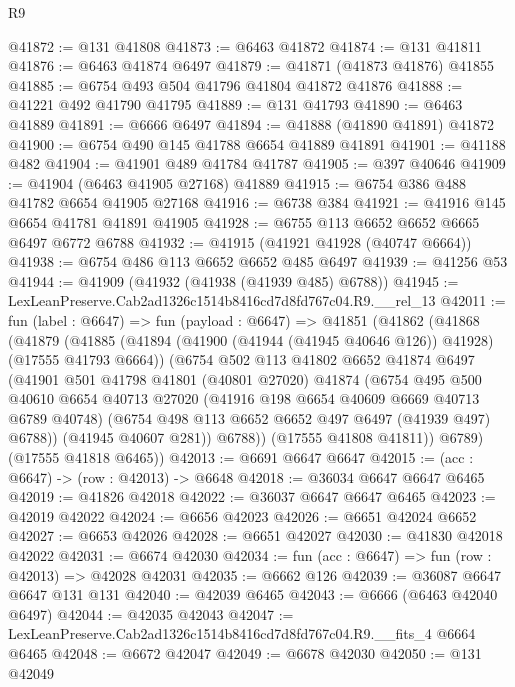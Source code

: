 \begin{lexlean}{R9}
\begin{coremodule}
@41872 := @131 @41808
@41873 := @6463 @41872
@41874 := @131 @41811
@41876 := @6463 @41874 @6497
@41879 := @41871 (@41873 @41876) @41855
@41885 := @6754 @493 @504 @41796 @41804 @41872 @41876
@41888 := @41221 @492 @41790 @41795
@41889 := @131 @41793
@41890 := @6463 @41889
@41891 := @6666 @6497
@41894 := @41888 (@41890 @41891) @41872
@41900 := @6754 @490 @145 @41788 @6654 @41889 @41891
@41901 := @41188 @482
@41904 := @41901 @489 @41784 @41787
@41905 := @397 @40646
@41909 := @41904 (@6463 @41905 @27168) @41889
@41915 := @6754 @386 @488 @41782 @6654 @41905 @27168
@41916 := @6738 @384
@41921 := @41916 @145 @6654 @41781 @41891 @41905
@41928 := @6755 @113 @6652 @6652 @6665 @6497 @6772 @6788
@41932 := @41915 (@41921 @41928 (@40747 @6664))
@41938 := @6754 @486 @113 @6652 @6652 @485 @6497
@41939 := @41256 @53
@41944 := @41909 (@41932 (@41938 (@41939 @485) @6788))
@41945 := LexLeanPreserve.Cab2ad1326c1514b8416cd7d8fd767c04.R9.__rel_13
@42011 := fun (label : @6647) =>
  fun (payload : @6647) =>
  @41851
    (@41862
      (@41868
        (@41879
          (@41885
            (@41894 (@41900 (@41944 (@41945 @40646 @126)) @41928) (@17555 @41793 @6664))
            (@6754
              @502
              @113
              @41802
              @6652
              @41874
              @6497
              (@41901
                @501
                @41798
                @41801
                (@40801 @27020)
                @41874
                (@6754
                  @495
                  @500
                  @40610
                  @6654
                  @40713
                  @27020
                  (@41916 @198 @6654 @40609 @6669 @40713 @6789 @40748)
                  (@6754 @498 @113 @6652 @6652 @497 @6497 (@41939 @497) @6788))
                (@41945 @40607 @281))
              @6788))
          (@17555 @41808 @41811))
        @6789)
      (@17555 @41818 @6465))
@42013 := @6691 @6647 @6647
@42015 := (acc : @6647) -> (row : @42013) -> @6648
@42018 := @36034 @6647 @6647 @6465
@42019 := @41826 @42018
@42022 := @36037 @6647 @6647 @6465
@42023 := @42019 @42022
@42024 := @6656 @42023
@42026 := @6651 @42024 @6652
@42027 := @6653 @42026
@42028 := @6651 @42027
@42030 := @41830 @42018 @42022
@42031 := @6674 @42030
@42034 := fun (acc : @6647) => fun (row : @42013) => @42028 @42031
@42035 := @6662 @126
@42039 := @36087 @6647 @6647 @131 @131
@42040 := @42039 @6465
@42043 := @6666 (@6463 @42040 @6497)
@42044 := @42035 @42043
@42047 := LexLeanPreserve.Cab2ad1326c1514b8416cd7d8fd767c04.R9.__fits_4 @6664 @6465
@42048 := @6672 @42047
@42049 := @6678 @42030
@42050 := @131 @42049

\end{coremodule}
\end{lexlean}
